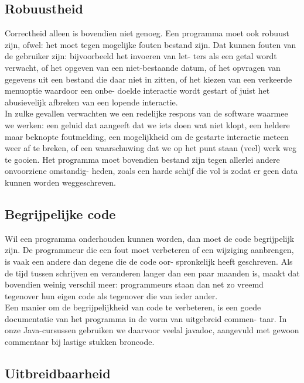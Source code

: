 \documentclass{article}
\begin{document}
	\subsection{Robuustheid}
	
	Correctheid alleen is bovendien niet genoeg. Een programma moet ook
	robuust zijn, ofwel: het moet tegen mogelijke fouten bestand zijn. Dat
	kunnen fouten van de gebruiker zijn: bijvoorbeeld het invoeren van let-
	ters als een getal wordt verwacht, of het opgeven van een niet-bestaande
	datum, of het opvragen van gegevens uit een bestand die daar niet in
	zitten, of het kiezen van een verkeerde menuoptie waardoor een onbe-
	doelde interactie wordt gestart of juist het abusievelijk afbreken van een
	lopende interactie. \\
	In zulke gevallen verwachten we een redelijke respons van de software
	waarmee we werken: een geluid dat aangeeft dat we iets doen wat niet
	klopt, een heldere maar beknopte foutmelding, een mogelijkheid om de
	gestarte interactie meteen weer af te breken, of een waarschuwing dat
	we op het punt staan (veel) werk weg te gooien. Het programma moet
	bovendien bestand zijn tegen allerlei andere onvoorziene omstandig-
	heden, zoals een harde schijf die vol is zodat er geen data kunnen
	worden weggeschreven. \\
	
	\subsection{Begrijpelijke code}
	
	Wil een programma onderhouden kunnen worden, dan moet de code
	begrijpelijk zijn. De programmeur die een fout moet verbeteren of een
	wijziging aanbrengen, is vaak een andere dan degene die de code oor-
	spronkelijk heeft geschreven. Als de tijd tussen schrijven en veranderen
	langer dan een paar maanden is, maakt dat bovendien weinig verschil
	meer: programmeurs staan dan net zo vreemd tegenover hun eigen code
	als tegenover die van ieder ander. \\
	Een manier om de begrijpelijkheid van code te verbeteren, is een goede
	documentatie van het programma in de vorm van uitgebreid commen-
	taar. In onze Java-cursussen gebruiken we daarvoor veelal javadoc,
	aangevuld met gewoon commentaar bij lastige stukken broncode. \\
	
	\subsection{Uitbreidbaarheid}
	
\end{document}
